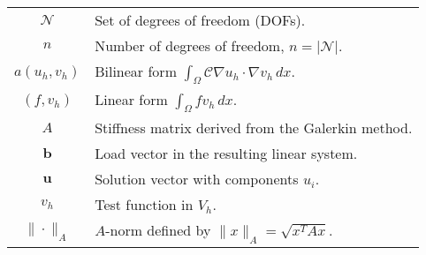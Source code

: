 \begin{longtable}{c p{10cm}}
    $\mathcal{N}$          & Set of degrees of freedom (DOFs).                                                       \\
    $n$                    & Number of degrees of freedom, $n = |\mathcal{N}|$.                                      \\
    $a(u_h, v_h)$          & Bilinear form $\int_\Omega \mathcal{C}\nabla u_h\cdot\nabla v_h\,dx$.                   \\
    $(f, v_h)$             & Linear form $\int_\Omega f v_h \,dx$.                                                   \\
    $A$                    & Stiffness matrix derived from the Galerkin method.                                      \\
    $\mathbf{b}$           & Load vector in the resulting linear system.                                             \\
    $\mathbf{u}$           & Solution vector with components $u_i$.                                                  \\
    $v_h$                  & Test function in $V_h$.                                                                 \\
    $\|\cdot\|_A$          & $A$-norm defined by $\|x\|_A = \sqrt{x^T A x}$.                                         \\
\end{longtable}

